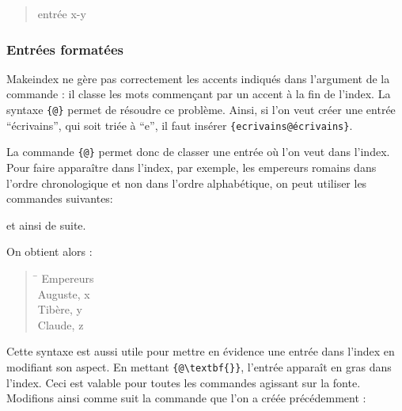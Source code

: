 \begin{quotation}
entrée x-y
\end{quotation}


\subsubsection{Entrées formatées}

Makeindex ne gère pas correctement les accents indiqués dans l'argument de la commande  : il classe les mots commençant par un accent à la fin de l'index. La syntaxe \verb|{|\verb|@|\verb+}+ permet de résoudre ce problème. Ainsi, si l'on veut créer une entrée \enquote{écrivains}, qui soit triée à \enquote{e}, il faut insérer \verb|{ecrivains@écrivains}|.

La commande \verb|{|\verb|@|\verb+}+ permet donc de classer une entrée où l'on veut dans l'index. Pour faire apparaître dans l'index, par exemple, les empereurs romains dans l'ordre chronologique et non dans l'ordre alphabétique, on peut utiliser les commandes suivantes:

\begin{latexcode}
et ainsi de suite. 
\end{latexcode}

On obtient alors :

\begin{quotation}
\begin{tabbing}
\hspace{0,5cm} \= \kill
Empereurs\\
\> Auguste, x\\
\> Tibère, y\\
\> Claude, z \\
\end{tabbing}
\end{quotation}

Cette syntaxe est aussi utile pour mettre en évidence une entrée dans l'index en modifiant son aspect. En mettant \verb|{|\verb|@\textbf{|\verb|}}|, l'entrée apparaît en gras dans l'index. Ceci est valable pour toutes les commandes agissant sur la fonte. Modifions ainsi comme suit la commande  que l'on a créée précédemment :

\begin{latexcode}
\newcommand\auteur[2]{#1~\textsc{#2}\index{#2 #1@\textsc{#2}, #1}\xspace}
\end{latexcode}

